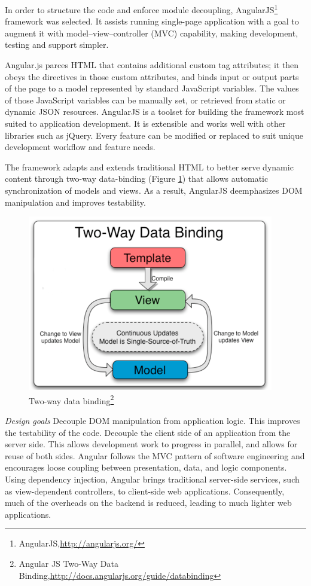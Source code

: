 	In order to structure the code and enforce module decoupling, AngularJS\footnote{AngularJS,\url{http://angularjs.org/}} framework was selected. It assists running single-page application with a goal to augment it with model–view–controller (MVC) capability, making development, testing and support simpler.

	Angular.js parces HTML that contains additional custom tag attributes; it then obeys the directives in those custom attributes, and binds input or output parts of the page to a model represented by standard JavaScript variables. The values of those JavaScript variables can be manually set, or retrieved from static or dynamic JSON resources\cite{ wiki:angular}. AngularJS is a toolset for building the framework most suited to application development. It is extensible and works well with other libraries such as jQuery. Every feature can be modified or replaced to suit unique development workflow and feature needs.

    The framework adapts and extends traditional HTML to better serve dynamic content through two-way data-binding (Figure \ref{img:data-binding}) that allows automatic synchronization of models and views. As a result, AngularJS deemphasizes DOM manipulation and improves testability.

	    \begin{figure}[!ht]
		\centering
		\includegraphics[scale=0.8]{images/2wayBinding.png}   
		\caption[Two-way data binding]{Two-way data binding\footnote{Angular JS Two-Way Data Binding,\url{http://docs.angularjs.org/guide/databinding}}}
		\label{img:data-binding}
		\end{figure}

	\emph{Design goals}
	\newline
	Decouple DOM manipulation from application logic. This improves the testability of the code. Decouple the client side of an application from the server side. This allows development work to progress in parallel, and allows for reuse of both sides.	Angular follows the MVC pattern of software engineering and encourages loose coupling between presentation, data, and logic components. Using dependency injection, Angular brings traditional server-side services, such as view-dependent controllers, to client-side web applications. Consequently, much of the overheads on the backend is reduced, leading to much lighter web applications.


